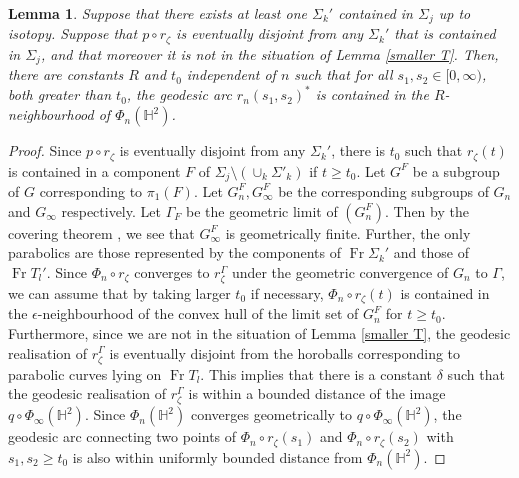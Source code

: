 \documentclass{amsart}
\newtheorem{lemma}[theorem]{Lemma}
\theoremstyle{definition}
\newcommand{\hyperbolic}{\mathbb{H}}
\newcommand{\Fr}{\operatorname{Fr}}
\newcommand\HHH{{\mathbb H}}
\begin{document}
\begin{lemma}
\label{stay near}
Suppose that there exists at least one $\Sigma_k'$  contained in $\Sigma_j$ up to isotopy.
Suppose that $p \circ r_\zeta$ is eventually disjoint from any $\Sigma_k'$ that is contained in $\Sigma_j$, and that moreover it is not in the situation of Lemma \ref{smaller T}.
Then, there are  constants $R$ and $t_0$ independent of $n$ such that for all $s_1, s_2\in [0,\infty)$, both  greater than $t_0$, the geodesic arc $r_n(s_1,s_2)^*$ is contained in the $R$-neighbourhood of $\Phi_n(\hyperbolic^2)$.
\end{lemma}
\begin{proof}
Since $p\circ r_\zeta$ is eventually disjoint from any $\Sigma_k'$, there is $t_0$ such that $r_\zeta(t)$ is contained in a component $F$ of $\Sigma_j \setminus (\cup_k \Sigma'_k)$ if $t \geq t_0$.
Let $G^F$ be a subgroup of $G$ corresponding to $\pi_1(F)$. Let $G_n^F, G_\infty^F$  be the corresponding subgroups of $G_n$ and $G_\infty$ respectively. Let $\Gamma_F$ 
be the geometric limit of $(G_n^F)$.
Then by the covering theorem \cite{thurstonnotes,canary-cover,OhQ}, we see that $G^F_\infty$ is geometrically finite. Further, the only parabolics are those represented by the components of $\Fr \Sigma_k'$ and those of $\Fr T_l'$.
Since $\Phi_n \circ r_\zeta$ converges to $r_\zeta^\Gamma$ under the geometric convergence of $G_n$ to $\Gamma$, we can assume that 
by taking larger $t_0$ if necessary,  $\Phi_n \circ r_\zeta(t)$ is contained in the $\epsilon$-neighbourhood of the  convex hull of the limit set of $G_n^F$ for $t \geq t_0$.
Furthermore, since we are not in the situation of Lemma \ref{smaller T}, the geodesic realisation of $r_\zeta^\Gamma$ is eventually disjoint from the horoballs corresponding to parabolic curves lying on $\Fr T_l$.
This implies that there is a constant $\delta$ such that  the geodesic realisation of $r_\zeta^\Gamma$ is within a bounded distance of the image $q \circ \Phi_\infty(\HHH^2)$.
Since $\Phi_n(\HHH^2)$ converges geometrically to $q \circ \Phi_\infty(\HHH^2)$, the geodesic arc connecting two points of $\Phi_n \circ r_\zeta(s_1)$ and $\Phi_n \circ r_\zeta(s_2)$ with $s_1, s_2 \geq t_0$ is also within uniformly bounded distance from $\Phi_n(\HHH^2)$.
\end{proof}
\end{document}
